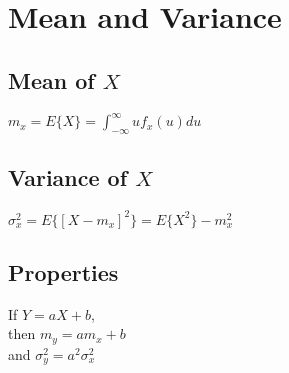 \section*{Mean and Variance}

\subsection*{Mean of $X$}
$m_x=E\{X\}=\int_{-\infty}^{\infty}uf_x(u)du$

\subsection*{Variance of $X$}    
$\sigma_x^2 = E\{[X-m_x]^2\}=E\{X^2\}-m_x^2$

\subsection*{Properties}
If $Y=aX+b$, \\ 
then $m_y=am_x+b$ \\
and 
$\sigma_y^2=a^2\sigma_x^2$
